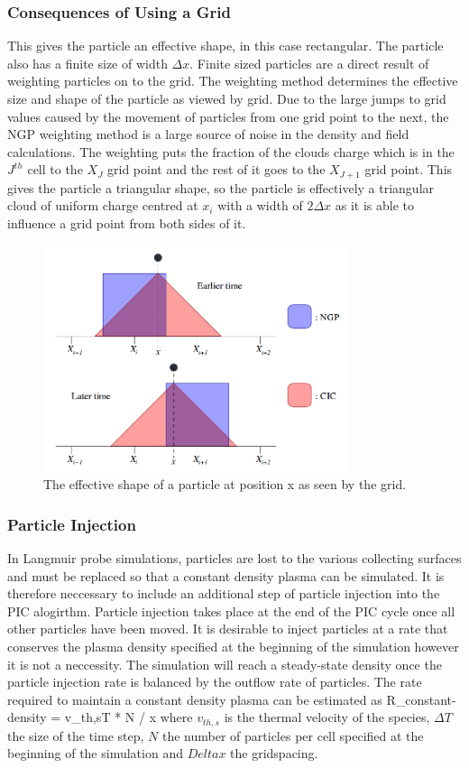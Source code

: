 \subsubsection{Consequences of Using a Grid}
This gives the particle an effective shape, in this case rectangular. The particle also has a finite size of width $\Delta x$. Finite sized particles are a direct result of weighting particles on to the grid. The weighting method determines the effective size and shape of the particle as viewed by grid. Due to the large jumps to grid values caused by the movement of particles from one grid point to the next, the NGP weighting method is a large source of noise in the density and field calculations.
The weighting puts the fraction of the clouds charge which is in the $J^{th}$ cell to the $X_J$ grid point and the rest of it goes to the $X_{J+1}$ grid point. This  gives the particle a triangular shape, so the particle is effectively a triangular cloud of uniform charge centred at $x_i$ with a width of $2\Delta x$ as it is able to influence a grid point from both sides of it.
\begin{figure}[H]
\centering
\includegraphics[width=0.8\textwidth]{particleshape}
\caption{The effective shape of a particle at position x as seen by the grid.\cite{shape}}
\label{fig:shape}
\end{figure}


\subsubsection{Particle Injection}
In Langmuir probe simulations, particles are lost to the various collecting surfaces and must be replaced so that a constant density plasma can be simulated. It is therefore neccessary to include an additional step of particle injection into the PIC alogirthm. Particle injection takes place at the end of the PIC cycle once all other particles have been moved.
It is desirable to inject particles at a rate that conserves the plasma density specified at the beginning of the simulation however it is not a neccessity. The simulation will reach a steady-state density once the particle injection rate is balanced by the outflow rate of particles. The rate required to maintain a constant density plasma can be estimated as 
\be
R_{constant-density} = v_{th,s}\Delta T * N / \Delta x
\ee
where $v_{th,s}$ is the thermal velocity of the species, $\Delta T$ the size of the time step, $N$ the number of particles per cell specified at the beginning of the simulation and $Delta x$ the gridspacing. 

